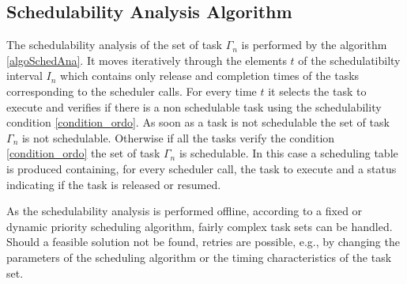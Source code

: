 \documentclass[conference,compsocconf]{IEEEtran}
\begin{document}
\subsection{Schedulability Analysis Algorithm}

The schedulability analysis of the set of task $\Gamma_n$ is performed by the
algorithm \ref{algoSchedAna}. It moves iteratively through the elements $t$ of
the schedulatibilty interval $I_n$ which contains only release and completion
times of the tasks corresponding to the scheduler calls. For every time $t$ it
selects the task to execute and verifies if there is a non schedulable task
using the schedulability condition \ref{condition_ordo}. As soon as a task is
not schedulable the set of task $\Gamma_n$ is not schedulable. Otherwise if all
the tasks verify the condition \ref{condition_ordo} the set of task $\Gamma_n$
is schedulable. In this case a scheduling table is produced containing, for
every scheduler call, the task to execute and a status indicating if the task
is released or resumed.

As the schedulability analysis is performed offline, according to a fixed or
dynamic priority scheduling algorithm, fairly complex task sets can be
handled. Should a feasible solution not be found, retries are possible, e.g.,
by changing the parameters of the scheduling algorithm or the timing
characteristics of the task set.

\begin{comment}
\begin{algorithm}[!h]
\caption{Analyse d'ordonnançabilité}
\begin{algorithmic}[1]
\label{algoSchedAna}
 \vspace{0.25cm}
  \STATE{$t \leftarrow r_{min}$}
  \STATE{ $G \leftarrow F$}
  \STATE{$ordonnançable  \leftarrow vrai$}  
   \WHILE{$(t < (tc+H_n))\wedge  (ordonnançable=vrai)$}
      \STATE{Calculer  $\phi(t)$}
     \STATE{$i \leftarrow 1$} 
     \WHILE{$(i\le n)\wedge (ordonnançable=vrai)$}
      \IF{ ($t \geq r_i^1)$}
        \STATE{Calculer  $c_i(t)$}
        \STATE{Calculer $d_i(t)$}
        \IF{$((c_i(t) > d_i(t)) \vee$ \\ $((t>r_i^1)\wedge (c_i(r^{-}(t))>0)\wedge(\phi(r^{-}(t)) \neq \tau_i) \wedge((t-r_i^1) mod T_i=0))$}
           \STATE{$ordonnançable  \leftarrow faux$}  
       \ENDIF
       \ENDIF
      \STATE{$i \leftarrow i+1$} 
    \ENDWHILE 
     \STATE{$t \leftarrow r^{+}(t)$}
      \STATE{ $G \leftarrow G \cup \{r^{+}(t)\}$}

   \ENDWHILE
\end{algorithmic} 
\end{algorithm}
\end{comment}
\end{document}
